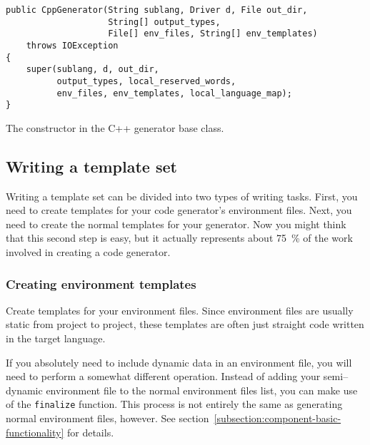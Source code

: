 \begin{Example}
\begin{minifbox}
\begin{small}
\begin{verbatim}
public CppGenerator(String sublang, Driver d, File out_dir,
                    String[] output_types,
                    File[] env_files, String[] env_templates)
    throws IOException
{
    super(sublang, d, out_dir,
          output_types, local_reserved_words,
          env_files, env_templates, local_language_map);
}
\end{verbatim}
\end{small}
\end{minifbox}
\caption{The constructor in the C++ generator base class.}
\label{example:component-cpp-constructor}
\end{Example}

\subsection{Writing a template set}

Writing a template set can be divided into two types of writing tasks. First,
you need to create templates for your code generator's environment files. Next,
you need to create the normal templates for your generator. Now you might think
that this second step is easy, but it actually represents about 75~\% of the
work involved in creating a code generator.

\subsubsection{Creating environment templates}

Create templates for your environment files. Since environment files are usually
static from project to project, these templates are often just straight code
written in the target language.

If you absolutely need to include dynamic data in an environment file, you will
need to perform a somewhat different operation. Instead of adding your
semi--dynamic environment file to the normal environment files list, you can
make use of the {\tt finalize} function. This process is not entirely the same
as generating normal environment files, however. See
section~\ref{subsection:component-basic-functionality} for details.

